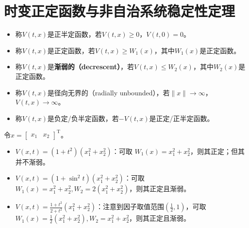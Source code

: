 \section{时变正定函数与非自治系统稳定性定理}\label{3Cref}
\begin{definition}
    \begin{itemize}[leftmargin=1em]
      \item 称$V(t,x)$是正半定函数，若$V(t,x)\ge 0$，$V(t,0)=0$。
      \item 称$V(t,x)$是正定函数，若$V(t,x)\ge W_1(x)$，其中$W_1(x)$是正定函数。
      \item 称$V(t,x)$是{\bf 渐弱的（decrescent）}，若$V(t,x)\le W_2(x)$，其中$W_2(x)$是正定函数。
      \item 称$V(t,x)$是径向无界的（radially unbounded），若$\|x\|\to\infty$，$V(t,x)\to \infty$。
      \item 称$V(t,x)$是负定/负半定函数，若$-V(t,x)$是正定/正半定函数。
    \end{itemize}
\end{definition}
\newpage
\begin{example}[正定与渐弱]
    令$x = [\begin{array}{cc}
    x_1& x_2
  \end{array}]^\mathrm{T}$。
  \begin{itemize}[leftmargin=1em]
    \item $V (x, t) = (1 + t^2) (x^2_1 + x_2^2)$：可取 $W_1 (x) = x^2_1 +
    x^2_2$，则其正定；但其并不渐弱。
    
    \item $V (x, t) = (1 + \sin^2 t) (x^2_1 + x_2^2)$：可取$W_1 (x) = x^2_1 +
    x^2_2, W_2 = 2 (x^2_1 + x^2_2)$，则其正定且渐弱。
    
    \item $V (x, t) = \frac{1 + t^2}{2 + t^2} (x^2_1 + x_2^2)$：注意到因子取值范围$(\frac12,1)$，可取 $W_1 (x)
    = \frac{1}{2} (x^2_1 + x^2_2), W_2 = x^2_1 + x^2_2$，则其正定且渐弱。
  \end{itemize}
\end{example}

